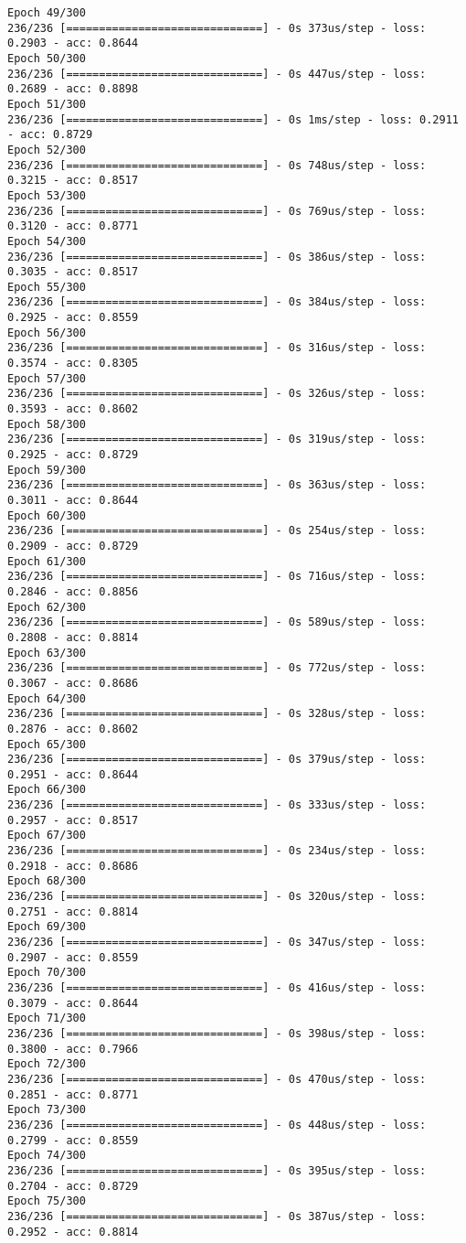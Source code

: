 \documentclass[11pt]{article}
\begin{document}
\begin{Verbatim}[commandchars=\\\{\}]
Epoch 49/300
236/236 [==============================] - 0s 373us/step - loss: 0.2903 - acc: 0.8644
Epoch 50/300
236/236 [==============================] - 0s 447us/step - loss: 0.2689 - acc: 0.8898
Epoch 51/300
236/236 [==============================] - 0s 1ms/step - loss: 0.2911 - acc: 0.8729
Epoch 52/300
236/236 [==============================] - 0s 748us/step - loss: 0.3215 - acc: 0.8517
Epoch 53/300
236/236 [==============================] - 0s 769us/step - loss: 0.3120 - acc: 0.8771
Epoch 54/300
236/236 [==============================] - 0s 386us/step - loss: 0.3035 - acc: 0.8517
Epoch 55/300
236/236 [==============================] - 0s 384us/step - loss: 0.2925 - acc: 0.8559
Epoch 56/300
236/236 [==============================] - 0s 316us/step - loss: 0.3574 - acc: 0.8305
Epoch 57/300
236/236 [==============================] - 0s 326us/step - loss: 0.3593 - acc: 0.8602
Epoch 58/300
236/236 [==============================] - 0s 319us/step - loss: 0.2925 - acc: 0.8729
Epoch 59/300
236/236 [==============================] - 0s 363us/step - loss: 0.3011 - acc: 0.8644
Epoch 60/300
236/236 [==============================] - 0s 254us/step - loss: 0.2909 - acc: 0.8729
Epoch 61/300
236/236 [==============================] - 0s 716us/step - loss: 0.2846 - acc: 0.8856
Epoch 62/300
236/236 [==============================] - 0s 589us/step - loss: 0.2808 - acc: 0.8814
Epoch 63/300
236/236 [==============================] - 0s 772us/step - loss: 0.3067 - acc: 0.8686
Epoch 64/300
236/236 [==============================] - 0s 328us/step - loss: 0.2876 - acc: 0.8602
Epoch 65/300
236/236 [==============================] - 0s 379us/step - loss: 0.2951 - acc: 0.8644
Epoch 66/300
236/236 [==============================] - 0s 333us/step - loss: 0.2957 - acc: 0.8517
Epoch 67/300
236/236 [==============================] - 0s 234us/step - loss: 0.2918 - acc: 0.8686
Epoch 68/300
236/236 [==============================] - 0s 320us/step - loss: 0.2751 - acc: 0.8814
Epoch 69/300
236/236 [==============================] - 0s 347us/step - loss: 0.2907 - acc: 0.8559
Epoch 70/300
236/236 [==============================] - 0s 416us/step - loss: 0.3079 - acc: 0.8644
Epoch 71/300
236/236 [==============================] - 0s 398us/step - loss: 0.3800 - acc: 0.7966
Epoch 72/300
236/236 [==============================] - 0s 470us/step - loss: 0.2851 - acc: 0.8771
Epoch 73/300
236/236 [==============================] - 0s 448us/step - loss: 0.2799 - acc: 0.8559
Epoch 74/300
236/236 [==============================] - 0s 395us/step - loss: 0.2704 - acc: 0.8729
Epoch 75/300
236/236 [==============================] - 0s 387us/step - loss: 0.2952 - acc: 0.8814

\end{Verbatim}
\end{document}
